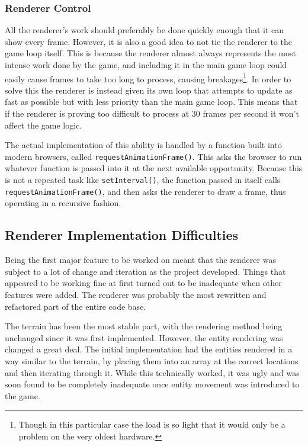 \subsubsection{Renderer Control}
All the renderer's work should preferably be done quickly enough that it can show every frame. However, it is also a good idea to not tie the renderer to the game loop itself. This is because the renderer almost always represents the most intense work done by the game, and including it in the main game loop could easily cause frames to take too long to process, causing breakages\footnote{Though in this particular case the load is so light that it would only be a problem on the very oldest hardware.}. In order to solve this the renderer is instead given its own loop that attempts to update as fast as possible but with less priority than the main game loop. This means that if the renderer is proving too difficult to process at 30 frames per second it won't affect the game logic.

The actual implementation of this ability is handled by a function built into modern browsers, called \texttt{requestAnimationFrame()}. This asks the browser to run whatever function is passed into it at the next available opportunity. Because this is not a repeated task like \texttt{setInterval()}, the function passed in itself calls \texttt{requestAnimationFrame()}, and then asks the renderer to draw a frame, thus operating in a recursive fashion.

\subsection{Renderer Implementation Difficulties}
Being the first major feature to be worked on meant that the renderer was subject to a lot of change and iteration as the project developed. Things that appeared to be working fine at first turned out to be inadequate when other features were added. The renderer was probably the most rewritten and refactored part of the entire code base.

The terrain has been the most stable part, with the rendering method being unchanged since it was first implemented. However, the entity rendering was changed a great deal. The initial implementation had the entities rendered in a way similar to the terrain, by placing them into an array at the correct locations and then iterating through it. While this technically worked, it was ugly and was soon found to be completely inadequate once entity movement was introduced to the game.


